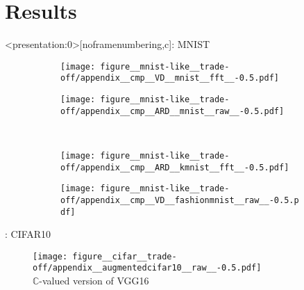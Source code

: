 \documentclass{beamer}
\newcommand{\cplx}{\mathbb{C}}
\begin{document}


\section{Results} %
\label{sec:results}

\begin{frame}<presentation:0>[noframenumbering,c]{\insertsection: MNIST}
  \begin{figure}[t]
    \begin{subfigure}[b]{0.5\columnwidth}
      \centering
      \texttt{[image: figure\_\_mnist-like\_\_trade-off/appendix\_\_cmp\_\_VD\_\_mnist\_\_fft\_\_-0.5.pdf]}
    \end{subfigure}\hspace{-1em}%
    \begin{subfigure}[b]{0.5\columnwidth}
      \centering
      \texttt{[image: figure\_\_mnist-like\_\_trade-off/appendix\_\_cmp\_\_ARD\_\_mnist\_\_raw\_\_-0.5.pdf]}
    \end{subfigure} \\ %
    \begin{subfigure}[b]{0.5\columnwidth}
      \centering
      \texttt{[image: figure\_\_mnist-like\_\_trade-off/appendix\_\_cmp\_\_ARD\_\_kmnist\_\_fft\_\_-0.5.pdf]}
    \end{subfigure}\hspace{-1em}%
    \begin{subfigure}[b]{0.5\columnwidth}
      \centering
      \texttt{[image: figure\_\_mnist-like\_\_trade-off/appendix\_\_cmp\_\_VD\_\_fashionmnist\_\_raw\_\_-0.5.pdf]}
    \end{subfigure}%
  \end{figure}

\end{frame}

\begin{frame}[c]{\insertsection: CIFAR10}
  \begin{figure}[t]
    \centering
    \texttt{[image: figure\_\_cifar\_\_trade-off/appendix\_\_augmentedcifar10\_\_raw\_\_-0.5.pdf]}
    \\
    {$\cplx$-valued version of VGG16 \citep{simonyan_very_2015}}
  \end{figure}

\end{frame}
\end{document}

